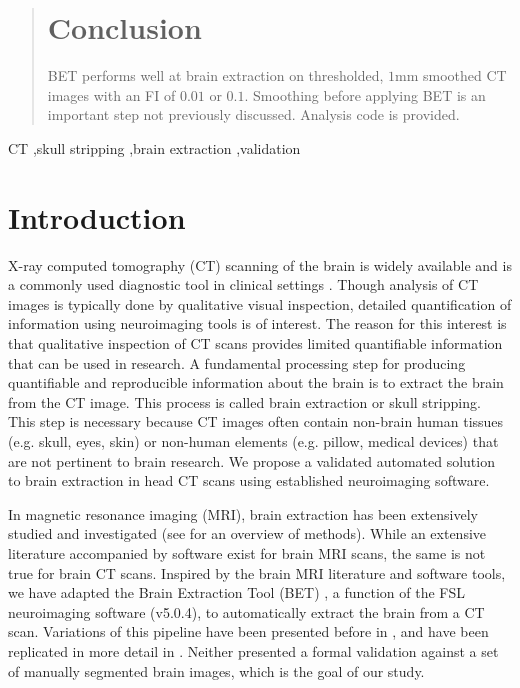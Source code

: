 \documentclass{elsarticle}\usepackage[]{graphicx}\usepackage[]{color}
\begin{document}
\begin{frontmatter}
\begin{abstract}
\section*{Conclusion}

BET performs well at brain extraction on thresholded, $1$mm smoothed CT images with an FI of $0.01$ or $0.1$.  Smoothing before applying BET is an important step not previously discussed.  Analysis code is provided.

\end{abstract}

\begin{keyword}
CT \sep skull stripping \sep brain extraction \sep validation
\end{keyword}

\end{frontmatter}



\section{Introduction}

X-ray computed tomography (CT) scanning of the brain is widely available and is a commonly used diagnostic tool in clinical settings \citep{sahni_management_2007, chalela2007magnetic, schellinger1999standardized}. Though analysis of CT images is typically done by qualitative visual inspection, detailed quantification of information using neuroimaging tools is of interest.  The reason for this interest is that qualitative inspection of CT scans provides limited quantifiable information that can be used in research. A fundamental processing step for producing quantifiable and  reproducible information about the brain is to extract the brain from the CT image. This process is called brain extraction or skull stripping.  This step is necessary because CT images often contain non-brain human tissues (e.g. skull, eyes, skin) or non-human elements (e.g. pillow, medical devices) that are not pertinent to brain research.  We propose a validated automated solution to brain extraction in head CT scans using established neuroimaging software.

In magnetic resonance imaging (MRI), brain extraction has been extensively studied and investigated (see \citet{wang2014knowledge} for an overview of methods).  While an extensive literature accompanied by software exist for brain MRI scans, the same is not true for brain CT scans.  Inspired by the brain MRI literature and software tools, we have adapted the Brain Extraction Tool (BET) \citep{smith_fast_2002}, a function of the FSL \citep{jenkinson_fsl_2012} neuroimaging software (v5.0.4), to automatically extract the brain from a CT scan.  Variations of this pipeline have been presented before in \citet{able}, and have been replicated in more detail in \citet{rorden_age-specific_2012}.  Neither presented a formal validation against a set of manually segmented brain images, which is the goal of our study. 
\end{document}
